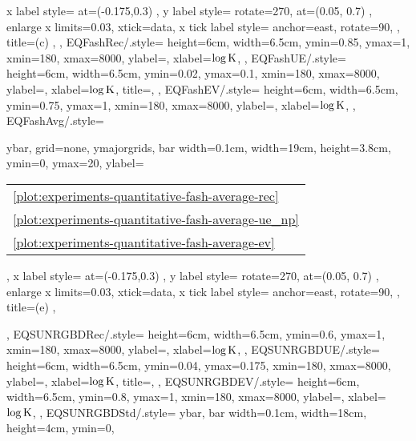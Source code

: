 {{		x label style={
            at={(-0.175,0.3)}
        },
        y label style={
        		rotate=270,
        		at={(0.05, 0.7)}
        },
		enlarge x limits=0.03,
		xtick=data,
		x tick label style={
			anchor=east,
			rotate=90,
		},
		title=(c) \SBD,
    },
    EQFashRec/.style={
        height=6cm,
        width=6.5cm,
        ymin=0.85,
        ymax=1,
        xmin=180,
        xmax=8000,
        ylabel=\Rec,
        xlabel=$\log\text{K}$,
    },
    EQFashUE/.style={
        height=6cm,
        width=6.5cm,
        ymin=0.02,
        ymax=0.1,
        xmin=180,
        xmax=8000,
        ylabel=\UE,
        xlabel=$\log\text{K}$,
        title=\Fash,
    },
    EQFashEV/.style={
        height=6cm,
        width=6.5cm,
        ymin=0.75,
        ymax=1,
        xmin=180,
        xmax=8000,
        ylabel=\EV,
        xlabel=$\log\text{K}$,
    },
    EQFashAvg/.style={
        ybar,
        grid=none,
        ymajorgrids,
		bar width=0.1cm,
		width=19cm,
		height=3.8cm,
		ymin=0,
		ymax=20,
		ylabel=\begin{tabular}{l}\ref{plot:experiments-quantitative-fash-average-rec} \ARec\\\ref{plot:experiments-quantitative-fash-average-ue_np} \AUE\\\ref{plot:experiments-quantitative-fash-average-ev} \AEV\end{tabular},
		x label style={
            at={(-0.175,0.3)}
        },
        y label style={
        		rotate=270,
        		at={(0.05, 0.7)}
        },
		enlarge x limits=0.03,
		xtick=data,
		x tick label style={
			anchor=east,
			rotate=90,
		},
		title=(e) \Fash,
    },
    EQSUNRGBDRec/.style={
        height=6cm,
        width=6.5cm,
        ymin=0.6,
        ymax=1,
        xmin=180,
        xmax=8000,
        ylabel=\Rec,
        xlabel=$\log\text{K}$,
    },
    EQSUNRGBDUE/.style={
        height=6cm,
        width=6.5cm,
        ymin=0.04,
        ymax=0.175,
        xmin=180,
        xmax=8000,
        ylabel=\UE,
        xlabel=$\log\text{K}$,
        title=\SUNRGBD,
    },
    EQSUNRGBDEV/.style={
        height=6cm,
        width=6.5cm,
        ymin=0.8,
        ymax=1,
        xmin=180,
        xmax=8000,
        ylabel=\EV,
        xlabel=$\log\text{K}$,
    },
    EQSUNRGBDStd/.style={
    		ybar,
		bar width=0.1cm,
		width=18cm,
		height=4cm,
		ymin=0,
}}
